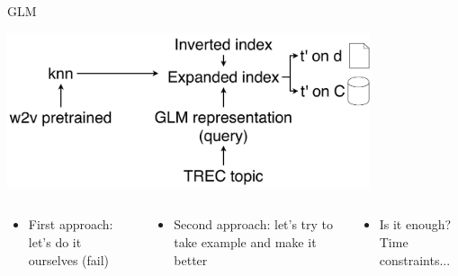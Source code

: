 \begin{frame}{GLM}
    \begin{center}
        \includegraphics[width=0.8\textwidth]{img/reproduction.pdf}
    \end{center}
    \begin{columns}
        \begin{column}{0.33\textwidth}
            \begin{itemize}
                \item First approach: let's do it ourselves (fail)
            \end{itemize}
        \end{column}
        \begin{column}{0.33\textwidth}
            \begin{itemize}
                \item Second approach: let's try to take example and make it better
            \end{itemize}
        \end{column}
        \begin{column}{0.33\textwidth}
            \begin{itemize}
                \item Is it enough? Time constraints...
            \end{itemize}
        \end{column}
    \end{columns}
\end{frame}
